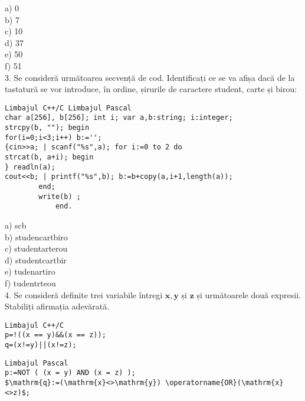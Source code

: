 a) 0\\
b) 7\\
c) 10\\
d) 37\\
e) 50\\
f) 51\\
3. Se consideră următoarea secvență de cod. Identificați ce se va afișa dacă de la tastatură se vor introduce, în ordine, șirurile de caractere student, carte și birou:

\begin{verbatim}
Limbajul C++/C Limbajul Pascal
char a[256], b[256]; int i; var a,b:string; i:integer;
strcpy(b, ""); begin
for(i=0;i<3;i++) b:='';
{cin>>a; | scanf("%s",a); for i:=0 to 2 do
strcat(b, a+i); begin
} readln(a);
cout<<b; | printf("%s",b); b:=b+copy(a,i+1,length(a));
        end;
        write(b) ;
            end.
\end{verbatim}

a) scb\\
b) studencartbiro\\
c) studentarterou\\
d) studentcartbir\\
e) tudenartiro\\
f) tudentrteou\\
4. Se consideră definite trei variabile întregi $\mathbf{x}, \mathbf{y}$ și $\mathbf{z}$ și următoarele două expresii. Stabiliți afirmația adevărată.

\begin{verbatim}
Limbajul C++/C
p=!((x == y)&&(x == z));
q=(x!=y)||(x!=z);
\end{verbatim}

\begin{verbatim}
Limbajul Pascal
p:=NOT ( (x = y) AND (x = z) );
$\mathrm{q}:=(\mathrm{x}<>\mathrm{y}) \operatorname{OR}(\mathrm{x}<>z)$;
\end{verbatim}

